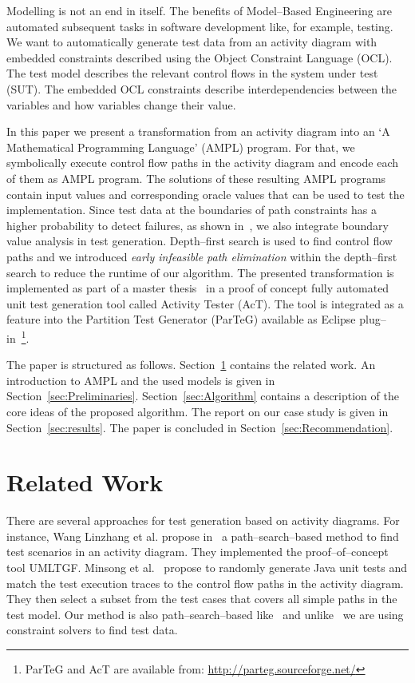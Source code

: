 \documentclass[runningheads,a4paper]{llncs}%
\begin{document}
Modelling is not an end in itself. The benefits of Model--Based Engineering are
automated subsequent tasks in software development like, for example, testing.
We want to automatically generate test data from an activity diagram with
embedded constraints described using the Object Constraint Language (OCL). The
test model describes the relevant control flows in the system under test (SUT).
The embedded OCL constraints describe interdependencies between the variables
and how variables change their value.

In this paper we present a transformation from an activity diagram into an `A
Mathematical Programming Language' (AMPL) program. For that, we symbolically
execute control flow paths in the activity diagram and encode each of them as
AMPL program. The solutions of these resulting AMPL programs contain input
values and corresponding oracle values that can be used to test the
implementation. Since test data at the boundaries of path constraints has a
higher probability to detect failures, as shown
in~\cite{Kosmatov04BoundaryCoverageCrit}, we also integrate boundary value
analysis in test generation. Depth--first search is used to find control flow
paths and we introduced \emph{early infeasible path elimination} within the
depth--first search to reduce the runtime of our algorithm. The presented
transformation is implemented as part of a master
thesis~\cite{Kurth2014AutomatedGen} in a proof of concept fully automated unit
test generation tool called Activity Tester (AcT). The tool is integrated as a
feature into the Partition Test Generator (ParTeG) available as Eclipse
plug--in~\footnote{ParTeG and AcT are available from: \href{http://parteg.sourceforge.net/}{http://parteg.sourceforge.net/}}.

The paper is structured as follows. Section~\ref{sec:LiteratureReview} contains
the related work. An introduction to AMPL and the used models is given in
Section~\ref{sec:Preliminaries}. Section~\ref{sec:Algorithm} contains a
description of the core ideas of the proposed algorithm. The report on our case
study is given in Section~\ref{sec:results}. The paper is concluded in
Section~\ref{sec:Recommendation}.%
%
\section{Related Work}%
\label{sec:LiteratureReview}%
There are several approaches for test generation based on activity diagrams. For
instance, Wang Linzhang et al. propose
in~\cite{Linzhang04GeneratingTestCasefromActivityGrayBoxMethod} a
path--search--based method to find test scenarios in an activity diagram. They
implemented the proof--of--concept tool UMLTGF. Minsong et
al.~\cite{mingsong2006automatic} propose to randomly generate Java unit tests
and match the test execution traces to the control flow paths in the activity
diagram. They then select a subset from the test cases that covers all simple
paths in the test model. Our method is also path--search--based
like~\cite{Linzhang04GeneratingTestCasefromActivityGrayBoxMethod} and
unlike~\cite{mingsong2006automatic} we are using constraint solvers to find test
data.
\end{document}
